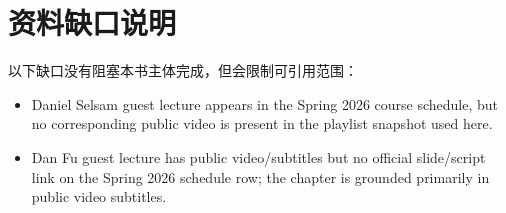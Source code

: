 \documentclass[a4paper]{article}
\begin{document}
\section{资料缺口说明}
以下缺口没有阻塞本书主体完成，但会限制可引用范围：
\begin{itemize}
\item Daniel Selsam guest lecture appears in the Spring 2026 course schedule, but no corresponding public video is present in the playlist snapshot used here.
\item Dan Fu guest lecture has public video/subtitles but no official slide/script link on the Spring 2026 schedule row; the chapter is grounded primarily in public video subtitles.
\end{itemize}
\end{document}
